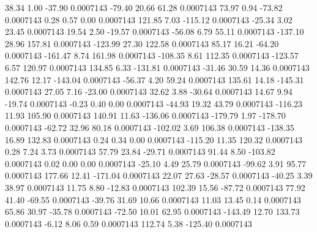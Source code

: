        38.34        1.00      -37.90     0.0007143
      -79.40       20.66       61.28     0.0007143
       73.97        0.94      -73.82     0.0007143
        0.28        0.57        0.00     0.0007143
      121.85        7.03     -115.12     0.0007143
      -25.34        3.02       23.45     0.0007143
       19.54        2.50      -19.57     0.0007143
      -56.08        6.79       55.11     0.0007143
     -137.10       28.96      157.81     0.0007143
     -123.99       27.30      122.58     0.0007143
       85.17       16.21      -64.20     0.0007143
     -161.47        8.74      161.98     0.0007143
     -108.35        8.61      112.35     0.0007143
     -123.57        6.57      120.97     0.0007143
      134.85        6.33     -131.81     0.0007143
      -31.46       30.59       14.36     0.0007143
      142.76       12.17     -143.04     0.0007143
      -56.37        4.20       59.24     0.0007143
      135.61       14.18     -145.31     0.0007143
       27.05        7.16      -23.00     0.0007143
       32.62        3.88      -30.64     0.0007143
       14.67        9.94      -19.74     0.0007143
       -0.23        0.40        0.00     0.0007143
      -44.93       19.32       43.79     0.0007143
     -116.23       11.93      105.90     0.0007143
      140.91       11.63     -136.06     0.0007143
     -179.79        1.97     -178.70     0.0007143
      -62.72       32.96       80.18     0.0007143
     -102.02        3.69      106.38     0.0007143
     -138.35       16.89      132.83     0.0007143
        0.24        0.34        0.00     0.0007143
     -115.20       11.35      120.32     0.0007143
        0.28        7.24        3.73     0.0007143
       57.79       23.84      -29.71     0.0007143
       91.44        8.50     -103.82     0.0007143
        0.02        0.00        0.00     0.0007143
      -25.10        4.49       25.79     0.0007143
      -99.62        3.91       95.77     0.0007143
      177.66       12.41     -171.04     0.0007143
       22.07       27.63      -28.57     0.0007143
      -40.25        3.39       38.97     0.0007143
       11.75        8.80      -12.83     0.0007143
      102.39       15.56      -87.72     0.0007143
       77.92       41.40      -69.55     0.0007143
      -39.76       31.69       10.66     0.0007143
       11.03       13.45        0.14     0.0007143
       65.86       30.97      -35.78     0.0007143
      -72.50       10.01       62.95     0.0007143
     -143.49       12.70      133.73     0.0007143
       -6.12        8.06        0.59     0.0007143
      112.74        5.38     -125.40     0.0007143
